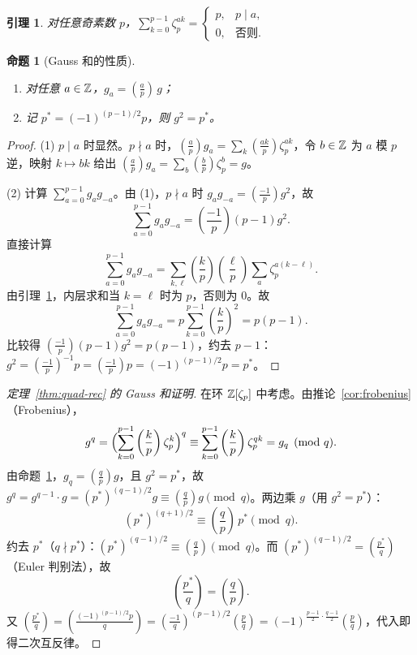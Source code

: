 \documentclass{article}
\newcommand{\leg}[2]{\left(\frac{#1}{#2}\right)}
\theoremstyle{plain}
\newtheorem{lem}[thm]{引理}
\newtheorem{prop}[thm]{命题}
\theoremstyle{definition}
\theoremstyle{remark}
\begin{document}
\begin{lem}\label{lem:gauss-sum-lin}
  对任意奇素数 $p$，$\sum_{k=0}^{p-1}\zeta_p^{ak}=
  \begin{cases}p,& p\mid a,\\0,&\text{否则}.
  \end{cases}$
\end{lem}

\begin{prop}[Gauss 和的性质]\label{prop:gauss-sum}
  \begin{enumerate}[(1)]
    \item 对任意 $a\in\mathbb{Z}$，$g_a=\leg{a}{p}\,g$；
    \item 记 $p^*=(-1)^{(p-1)/2}p$，则 $g^2=p^*$。
  \end{enumerate}
\end{prop}

\begin{proof}
  (1) $p\mid a$ 时显然。$p\nmid a$ 时，$\leg{a}{p}g_a=\sum_k\leg{ak}{p}\zeta_p^{ak}$，令 $b\in\mathbb{Z}$ 为 $a$ 模 $p$ 逆，映射 $k\mapsto bk$ 给出 $\leg{a}{p}g_a=\sum_b\leg{b}{p}\zeta_p^b=g$。

  (2) 计算 $\sum_{a=0}^{p-1}g_ag_{-a}$。由 (1)，$p\nmid a$ 时 $g_ag_{-a}=\leg{-1}{p}g^2$，故
  \[
    \sum_{a=0}^{p-1}g_ag_{-a}=\leg{-1}{p}(p-1)g^2.
  \]
  直接计算
  \[
    \sum_{a=0}^{p-1}g_ag_{-a}=\sum_{k,\ell}\leg{k}{p}\leg{\ell}{p}\sum_a\zeta_p^{a(k-\ell)}.
  \]
  由引理~\ref{lem:gauss-sum-lin}，内层求和当 $k=\ell$ 时为 $p$，否则为 $0$。故
  \[
    \sum_{a=0}^{p-1}g_ag_{-a}=p\sum_{k=0}^{p-1}\leg{k}{p}^2=p(p-1).
  \]
  比较得 $\leg{-1}{p}(p-1)g^2=p(p-1)$，约去 $p-1$：$g^2=\leg{-1}{p}^{-1}p=\leg{-1}{p}p=(-1)^{(p-1)/2}p=p^*$。
\end{proof}

\begin{proof}[定理~\ref{thm:quad-rec} 的 Gauss 和证明]
  在环 $\mathbb{Z}[\zeta_p]$ 中考虑。由推论~\ref{cor:frobenius}（Frobenius），
  \[
    g^q=\Bigl(\sum_{k=0}^{p-1}\leg{k}{p}\zeta_p^k\Bigr)^q\equiv\sum_{k=0}^{p-1}\leg{k}{p}\zeta_p^{qk}=g_q\pmod{q}.
  \]
  由命题~\ref{prop:gauss-sum}，$g_q=\leg{q}{p}g$，且 $g^2=p^*$，故 $g^q=g^{q-1}\cdot g=(p^*)^{(q-1)/2}g\equiv\leg{q}{p}g\pmod q$。两边乘 $g$（用 $g^2=p^*$）：
  \[
    (p^*)^{(q+1)/2}\equiv\leg{q}{p}\,p^*\pmod q.
  \]
  约去 $p^*$（$q\nmid p^*$）：$(p^*)^{(q-1)/2}\equiv\leg{q}{p}\pmod q$。而 $(p^*)^{(q-1)/2}=\leg{p^*}{q}$（Euler 判别法），故
  \[
    \leg{p^*}{q}=\leg{q}{p}.
  \]
  又 $\leg{p^*}{q}=\leg{(-1)^{(p-1)/2}p}{q}=\leg{-1}{q}^{(p-1)/2}\leg{p}{q}=(-1)^{\frac{p-1}{2}\cdot\frac{q-1}{2}}\leg{p}{q}$，代入即得二次互反律。
\end{proof}
\end{document}
